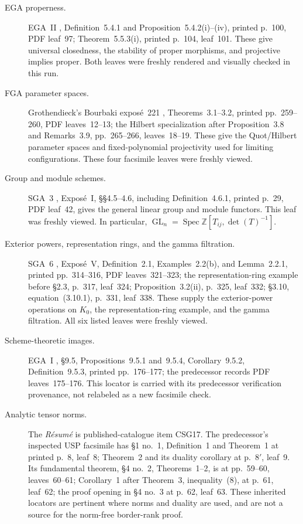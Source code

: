 \begin{description}
\item[EGA properness.]
EGA~II \cite{EGA2}, Definition~5.4.1 and
Proposition~5.4.2(i)--(iv), printed p.~100, PDF leaf~97;
Theorem~5.5.3(i), printed p.~104, leaf~101.
These give universal closedness, the stability of proper
morphisms, and projective implies proper. Both leaves were
freshly rendered and visually checked in this run.

\item[FGA parameter spaces.]
Grothendieck's Bourbaki expos\'e~221 \cite{FGA},
Theorems~3.1--3.2, printed pp.~259--260, PDF leaves~12--13;
the Hilbert specialization after Proposition~3.8 and
Remarks~3.9, pp.~265--266, leaves~18--19.
These give the Quot/Hilbert parameter spaces and fixed-polynomial
projectivity used for limiting configurations. These four
facsimile leaves were freshly viewed.

\item[Group and module schemes.]
SGA~3 \cite{SGA3}, Expos\'e~I, \S\S4.5--4.6,
including Definition~4.6.1, printed p.~29, PDF leaf~42,
gives the general linear group and module functors. This leaf
was freshly viewed. In particular,
$\operatorname{GL}_n=\operatorname{Spec}
\mathbb Z[T_{ij},\det(T)^{-1}]$.

\item[Exterior powers, representation rings, and the gamma filtration.]
SGA~6 \cite{SGA6}, Expos\'e~V, Definition~2.1,
Examples~2.2(b), and Lemma~2.2.1, printed pp.~314--316,
PDF leaves~321--323; the representation-ring example before
\S2.3, p.~317, leaf~324; Proposition~3.2(ii), p.~325,
leaf~332; \S3.10, equation~(3.10.1), p.~331, leaf~338.
These supply the exterior-power operations on $K_0$, the
representation-ring example, and the gamma filtration.
All six listed leaves were freshly viewed.

\item[Scheme-theoretic images.]
EGA~I \cite{EGA1}, \S9.5, Propositions~9.5.1 and~9.5.4,
Corollary~9.5.2, Definition~9.5.3, printed pp.~176--177;
the predecessor records PDF leaves~175--176. This locator
is carried with its predecessor verification provenance,
not relabeled as a new facsimile check.

\item[Analytic tensor norms.]
The \emph{R\'esum\'e} \cite{Resume} is published-catalogue
item CSG17. The predecessor's inspected USP facsimile has
\S1 no.~1, Definition~1 and Theorem~1 at printed p.~8,
leaf~8; Theorem~2 and its duality corollary at p.~$8'$,
leaf~9. Its fundamental theorem, \S4 no.~2,
Theorems~1--2, is at pp.~59--60, leaves~60--61;
Corollary~1 after Theorem~3, inequality~(8), at p.~61,
leaf~62; the proof opening in \S4 no.~3 at p.~62,
leaf~63. These inherited locators are pertinent where
norms and duality are used, and are not a source for the
norm-free border-rank proof.


\end{description}
